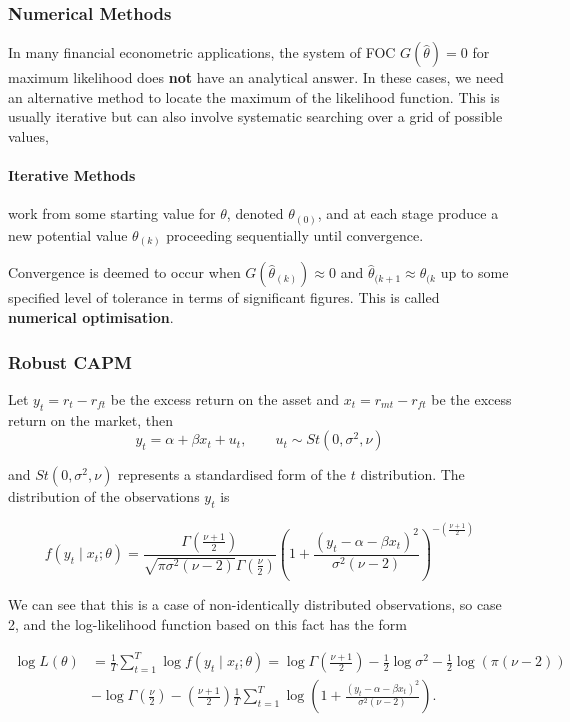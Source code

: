 \documentclass[11pt]{article}
\begin{document}
\subsubsection{Numerical Methods}

In many financial econometric applications, the system of FOC $G(\hat{\theta}) = 0$ for maximum likelihood does \textbf{not} have an analytical answer. In these cases, we need an alternative method to locate the maximum of the likelihood function. This is usually iterative but can also involve systematic searching over a grid of possible values,

\paragraph{Iterative Methods} work from some starting value for $\theta$, denoted $\theta_{(0)}$, and at each stage produce a new potential value $\theta_{(k)}$ proceeding sequentially until convergence.

Convergence is deemed to occur when $G(\hat{\theta}_{(k)}) \approx 0$ and $\hat{\theta}_{(k+1} \approx \hat{\theta}_{(k}$ up to some specified level of tolerance in terms of significant figures. This is called \textbf{numerical optimisation}.

\subsubsection{Robust CAPM}

Let $y_t = r_t - r_{ft}$ be the excess return on the asset and $x_t = r_{mt} - r_{ft}$ be the excess return on the market, then
\[y_t = \alpha + \beta x_t + u_t, \qquad u_t \sim St(0,\sigma^2,\nu)\]

and $St(0,\sigma^2,\nu)$ represents a standardised form of the $t$ distribution. The distribution of the observations $y_t$ is

\begin{equation}
f\left(y_t \mid x_t ; \theta\right)=\frac{\Gamma\left(\frac{\nu+1}{2}\right)}{\sqrt{\pi \sigma^2(\nu-2)} \Gamma\left(\frac{\nu}{2}\right)}\left(1+\frac{\left(y_t-\alpha-\beta x_t\right)^2}{\sigma^2(\nu-2)}\right)^{-\left(\frac{\nu+1}{2}\right)}
\end{equation}

We can see that this is a case of non-identically distributed observations, so case 2, and the log-likelihood function based on this fact has the form

\begin{equation}
\begin{aligned}
\log L(\theta) & =\frac{1}{T} \sum_{t=1}^T \log f\left(y_t \mid x_t ; \theta\right)=\log \Gamma\left(\frac{\nu+1}{2}\right)-\frac{1}{2} \log \sigma^2-\frac{1}{2} \log (\pi(\nu-2)) \\
& -\log \Gamma\left(\frac{\nu}{2}\right)-\left(\frac{\nu+1}{2}\right) \frac{1}{T} \sum_{t=1}^T \log \left(1+\frac{\left(y_t-\alpha-\beta x_t\right)^2}{\sigma^2(\nu-2)}\right) .
\end{aligned}
\end{equation}
\end{document}
